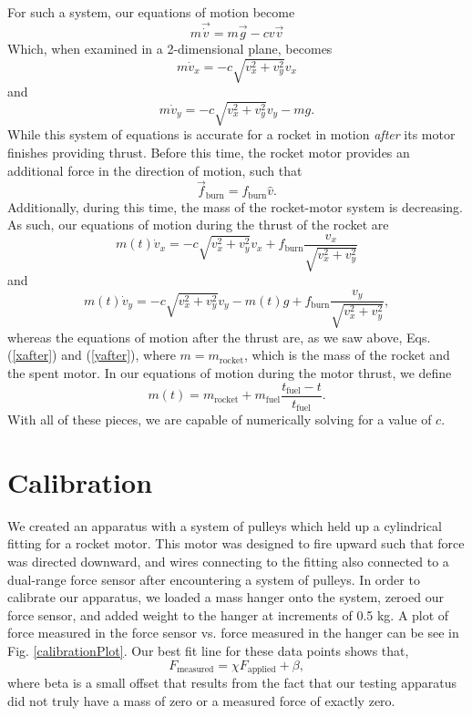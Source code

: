 \documentclass[aps,pra,twocolumn]{revtex4-1}
\begin{document}
For such a system, our equations of motion become \cite{taylor2005}
\begin{equation}
m \vec{\dot{v}} = m \vec{g} - c v \vec{v}
\end{equation}
Which, when examined in a 2-dimensional plane, becomes
\begin{equation}
m \dot{v}_x  = -c\sqrt{v_x^2 + v_y^2}v_x \label{xafter}
\end{equation}
and
\begin{equation}
m \dot{v}_y  = -c\sqrt{v_x^2 + v_y^2}v_y - mg. \label{yafter}
\end{equation}
While this system of equations is accurate for a rocket in motion \emph{after} its motor finishes providing thrust.  Before this time, the rocket motor provides an additional force in the direction of motion, such that
\begin{equation}
\vec{f}_\text{burn} = f_\text{burn} \hat{v}.
\end{equation}
Additionally, during this time, the mass of the rocket-motor system is decreasing.  As such, our equations of motion during the thrust of the rocket are
\begin{equation}
m(t) \dot{v}_x  = -c\sqrt{v_x^2 + v_y^2}v_x + f_\text{burn} \frac{v_x}{\sqrt{v_x^2 + v_y^2}} \label{xbefore}
\end{equation}
and
\begin{equation}
m(t) \dot{v}_y  = -c\sqrt{v_x^2 + v_y^2}v_y - m(t)g + f_\text{burn} \frac{v_y}{\sqrt{v_x^2 + v_y^2}}, \label{ybefore}
\end{equation}
whereas  the equations of motion after the thrust are, as we saw above, Eqs. (\ref{xafter}) and (\ref{yafter}), where $m = m_\text{rocket}$, which is the mass of the rocket and the spent motor.  In our equations of motion during the motor thrust, we define
\begin{equation}
m(t) = m_\text{rocket} + m_\text{fuel} \frac{t_\text{fuel} - t}{t_\text{fuel}}.
\end{equation}
With all of these pieces, we are capable of numerically solving for a value of $c$.


\section{\label{section 3} Calibration}
We created an apparatus with a system of pulleys which held up a cylindrical fitting for a rocket motor.  This motor was designed to fire upward such that force was directed downward, and wires connecting to the fitting also connected to a dual-range force sensor after encountering a system of pulleys.  In order to calibrate our apparatus, we loaded a mass hanger onto the system, zeroed our force sensor, and added weight to the hanger at increments of 0.5 kg.  A plot of force measured in the force sensor vs. force measured in the hanger can be see in Fig. \ref{calibrationPlot}.  Our best fit line for these data points shows that,
\begin{equation}
F_\text{measured} = \chi F_\text{applied} + \beta ,
\end{equation}
where beta is a small offset that results from the fact that our testing apparatus did not truly have a mass of zero or a measured force of exactly zero.
\end{document}
